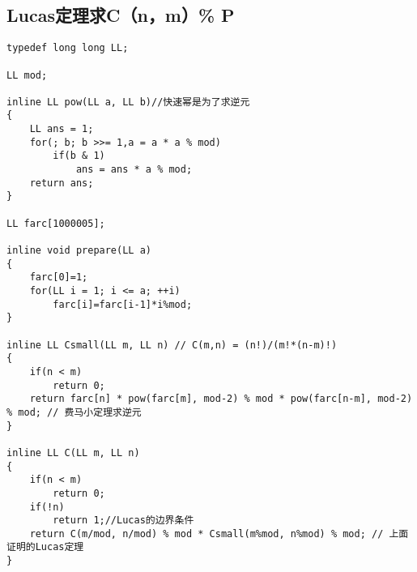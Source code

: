 \documentclass[twocolumn,a4]{article}
\begin{document}
\subsection{Lucas定理求C（n，m）\% P}
\begin{lstlisting}
typedef long long LL;

LL mod;

inline LL pow(LL a, LL b)//快速幂是为了求逆元
{
    LL ans = 1;
    for(; b; b >>= 1,a = a * a % mod)
        if(b & 1)
            ans = ans * a % mod;
    return ans;
}

LL farc[1000005];

inline void prepare(LL a)
{
    farc[0]=1;
    for(LL i = 1; i <= a; ++i)
        farc[i]=farc[i-1]*i%mod;
}

inline LL Csmall(LL m, LL n) // C(m,n) = (n!)/(m!*(n-m)!)
{
    if(n < m)
        return 0;
    return farc[n] * pow(farc[m], mod-2) % mod * pow(farc[n-m], mod-2) % mod; // 费马小定理求逆元
}

inline LL C(LL m, LL n)
{
    if(n < m)
        return 0;
    if(!n)
        return 1;//Lucas的边界条件
    return C(m/mod, n/mod) % mod * Csmall(m%mod, n%mod) % mod; // 上面证明的Lucas定理
}
\end{lstlisting}
\end{document}
